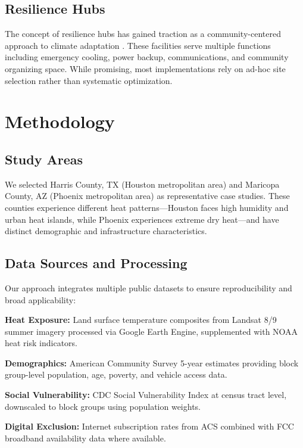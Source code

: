 \documentclass[conference]{IEEEtran}
\begin{document}
\subsection{Resilience Hubs}

The concept of resilience hubs has gained traction as a community-centered approach to climate adaptation \cite{hubs2023}. These facilities serve multiple functions including emergency cooling, power backup, communications, and community organizing space. While promising, most implementations rely on ad-hoc site selection rather than systematic optimization.

\section{Methodology}

\subsection{Study Areas}

We selected Harris County, TX (Houston metropolitan area) and Maricopa County, AZ (Phoenix metropolitan area) as representative case studies. These counties experience different heat patterns—Houston faces high humidity and urban heat islands, while Phoenix experiences extreme dry heat—and have distinct demographic and infrastructure characteristics.

\subsection{Data Sources and Processing}

Our approach integrates multiple public datasets to ensure reproducibility and broad applicability:

\textbf{Heat Exposure:} Land surface temperature composites from Landsat 8/9 summer imagery processed via Google Earth Engine, supplemented with NOAA heat risk indicators.

\textbf{Demographics:} American Community Survey 5-year estimates providing block group-level population, age, poverty, and vehicle access data.

\textbf{Social Vulnerability:} CDC Social Vulnerability Index at census tract level, downscaled to block groups using population weights.

\textbf{Digital Exclusion:} Internet subscription rates from ACS combined with FCC broadband availability data where available.
\end{document}
